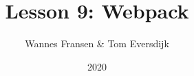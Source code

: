 \documentclass{beamer}
\title{Lesson 9: Webpack}
\author{Wannes Fransen \& Tom Eversdijk}
\institute{UC Leuven}
\date{2020}
\begin{document}
\frame{\titlepage}
 


\end{document}
